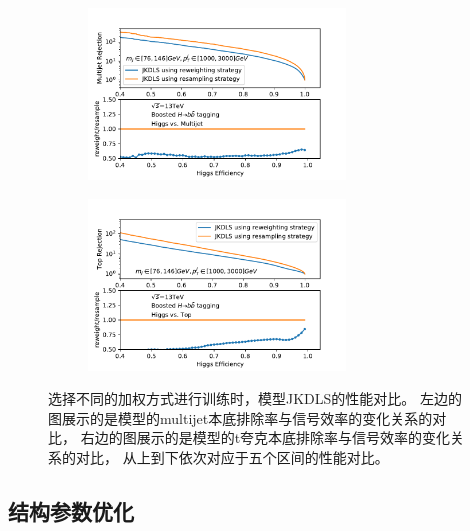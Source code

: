 \begin{figure}[htbp]
\begin{subfigure}{.5\textwidth}
   \caption{}
   \label{fig:}
  \end{subfigure}
 \newline 
   \begin{subfigure}{.5\textwidth}
  \centering
   \includegraphics[width=0.75\textwidth]{figuresXbb/Reweight/QCDMASSPT3.pdf}
   \caption{}
   \label{fig:}
  \end{subfigure}
  \begin{subfigure}{.5\textwidth}
  \centering
   \includegraphics[width=0.75\textwidth]{figuresXbb/Reweight/TOPMASSPT3.pdf}
   \caption{}
   \label{fig:}
  \end{subfigure}
  \caption{
  选择不同的加权方式进行训练时，模型JKDLS的性能对比。
  左边的图展示的是模型的multijet本底排除率与信号效率的变化关系的对比，
右边的图展示的是模型的t夸克本底排除率与信号效率的变化关系的对比，
从上到下依次对应于五个区间的性能对比。
  }
  \label{fig:ReweightROC}
\end{figure} 




\subsection{结构参数优化}
\label{sec:XbbTagger4}

